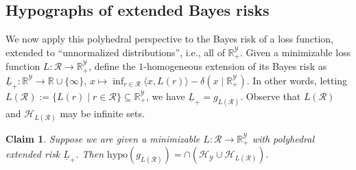 \documentclass[twoside,11pt]{article}
\newcommand{\reals}{\mathbb{R}}
\renewcommand{\H}{\mathcal{H}}
\newcommand{\R}{\mathcal{R}}
\newcommand{\V}{\mathcal{V}}
\newcommand{\Y}{\mathcal{Y}}
\newcommand{\risk}[1]{\underline{#1}}
\newcommand{\inprod}[2]{\langle #1, #2 \rangle}%
\newcommand{\hyp}{\mathrm{hypo}}
\newtheorem{claim}{Claim}
\begin{document}
\subsection{Hypographs of extended Bayes risks}\label{appsubsec:phase2}
\noindent
We now apply this polyhedral perspective to the Bayes risk of a loss function, extended to ``unnormalized distributions'', i.e., all of $\reals^\Y_+$.
Given a minimizable loss function $L : \R \to \reals^\Y_+$, define the $1$-homogeneous extension of its Bayes risk as
$\risk{L}_+:\reals^\Y\to\reals\cup\{\infty\}$, $x \mapsto \inf_{r\in\R} \inprod{x}{L(r)} - \delta(x \mid \reals^\Y_+)$.
In other words, letting $L(\R) := \{L(r) \mid r\in\R\} \subseteq \reals^\Y_+$, we have $\risk L_+ = g_{L(\R)}$.
%
Observe that $L(\R)$ and $\H_{L(\R)}$ may be infinite sets.  
\begin{claim}\label{claim:gV-equals-riskL}
	Suppose we are given a minimizable $L : \R \to \reals^\Y_+$ with polyhedral extended risk $\risk L_+$.
	Then $\hyp(g_{L(\R)}) = \cap(\H_\Y \cup \H_{L(\R)})$.
\end{claim}
\end{document}
